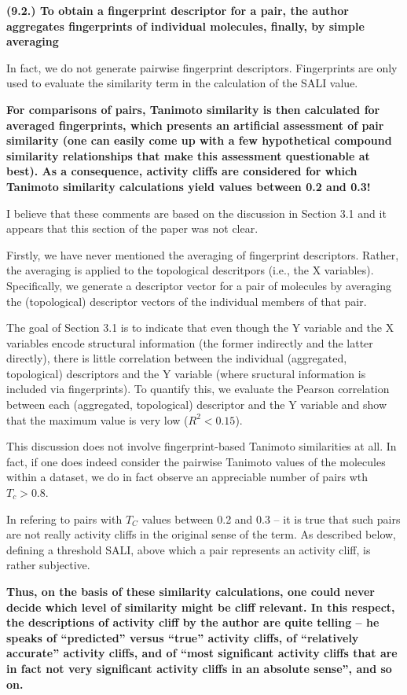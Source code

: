 \documentclass[letterpaper, 12pt]{article}
\begin{document}
\textbf{(9.2.) To obtain a fingerprint descriptor for a pair, the author aggregates fingerprints of
  individual molecules, finally, by simple averaging}

In fact, we do not generate pairwise fingerprint descriptors. Fingerprints are only used to evaluate
the similarity term in the calculation of the SALI value.

\textbf{For comparisons of pairs, Tanimoto similarity is then calculated for averaged fingerprints,
  which presents an artificial assessment of pair similarity (one can easily come up with a few
  hypothetical compound similarity relationships that make this assessment questionable at best). As
  a consequence, activity cliffs are considered for which Tanimoto similarity calculations yield
  values between 0.2 and 0.3!}

I believe that these comments are based on the discussion in Section 3.1 and it appears that this
section of the paper was not clear.

Firstly, we have never mentioned the averaging of fingerprint descriptors. Rather, the averaging is
applied to the topological descritpors (i.e., the X variables). Specifically, we generate a
descriptor vector for a pair of molecules by averaging the (topological) descriptor vectors of the
individual members of that pair.

The goal of Section 3.1 is to indicate that even though the Y variable and the X variables encode
structural information (the former indirectly and the latter directly), there is little correlation
between the individual (aggregated, topological) descriptors and the Y variable (where sructural
information is included via fingerprints). To quantify this, we evaluate the Pearson correlation
between each (aggregated, topological) descriptor and the Y variable and show that the maximum value
is very low ($R^2 < 0.15$).

This discussion does not involve fingerprint-based Tanimoto similarities at all. In fact, if one
does indeed consider the pairwise Tanimoto values of the molecules within a dataset, we do in fact
observe an appreciable number of pairs wth $T_c > 0.8$.

In refering to pairs with $T_C$ values between 0.2 and 0.3 -- it is true that such pairs are not
really activity cliffs in the original sense of the term. As described below, defining a threshold
SALI, above which a pair represents an activity cliff, is rather subjective. 

\textbf{Thus, on the basis of these similarity calculations, one could never decide which level of
  similarity might be cliff relevant. In this respect, the descriptions of activity cliff by the
  author are quite telling – he speaks of “predicted” versus “true” activity cliffs, of “relatively
  accurate” activity cliffs, and of “most significant activity cliffs that are in fact not very
  significant activity cliffs in an absolute sense”, and so on. }
\end{document}
